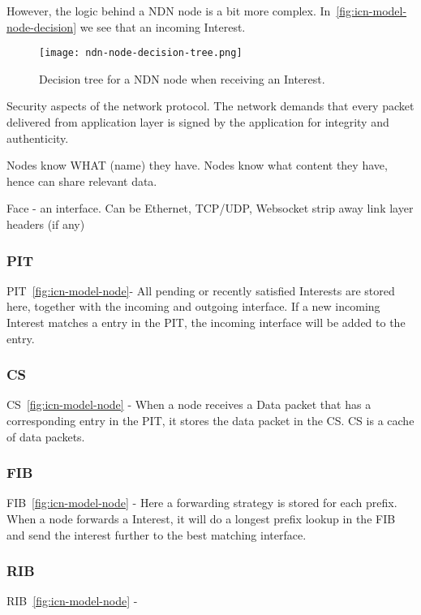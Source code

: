 However, the logic behind a \gls{NDN} node is a bit more complex. 
In~\autoref{fig:icn-model-node-decision} we see that an incoming Interest.
\begin{figure}[ht]
  \centering
  \texttt{[image: ndn-node-decision-tree.png]}
  \caption{Decision tree for a \gls{NDN} node when receiving an Interest.}
  \label{fig:icn-model-node-decision}
\end{figure}



Security aspects of the network protocol. 
The network demands that every packet delivered from application layer is signed by the application for integrity and authenticity.

Nodes know WHAT (name) they have. 
Nodes know what content they have, hence can share relevant data.

Face - an interface. Can be Ethernet, \gls{TCP}/\gls{UDP}, Websocket
strip away link layer headers (if any)

\subsubsection{\gls{PIT}}\label{pit}
\gls{PIT}~\autoref{fig:icn-model-node}- All pending or recently satisfied Interests are stored here, together with the incoming and outgoing interface.
If a new incoming Interest matches a entry in the \gls{PIT}, the incoming interface will be added to the entry. 


\subsubsection{\gls{CS}}\label{content-store}
\gls{CS}~\autoref{fig:icn-model-node} - When a node receives a Data packet that has a corresponding entry in the \gls{PIT}, it stores the data packet in the \gls{CS}. \gls{CS} is a cache of data packets.


\subsubsection{\gls{FIB}}\label{fib}
\gls{FIB}~\autoref{fig:icn-model-node} - Here a forwarding strategy is stored for each prefix. 
When a node forwards a Interest, it will do a longest prefix lookup in the \gls{FIB} and send the interest further to the best matching interface.


\subsubsection{\gls{RIB}}\label{rib}
\gls{RIB}~\autoref{fig:icn-model-node} - 

